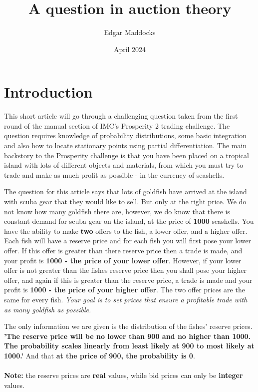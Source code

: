 \documentclass{article}
\title{A question in auction theory}
\author{Edgar Maddocks}
\date{April 2024}
\begin{document}
\maketitle

\section*{Introduction}
\begingroup
This short article will go through a challenging question taken from the first round of the manual section of
IMC's Prosperity 2 trading challenge. The question requires knowledge of probability 
distributions, some basic integration and also how to locate stationary points using 
partial differentiation. The main backstory to the Prosperity challenge is that you have been placed
on a tropical island with lots of different objects and materials, from which you must try to trade and make as
much profit as possible - in the currency of seashells. 

The question for this article says that lots of goldfish have 
arrived at the island with scuba gear that they would like to sell. But only at the right price. We do not know 
how many goldfish there are, however, we do know that there is constant demand for scuba gear on the island, 
at the price of \textbf{1000} seashells. You have the ability to make \textbf{two} offers to the fish, 
a lower offer, and a higher offer. Each fish will have a reserve price and for each fish you will first pose 
your lower offer. If this offer  is greater than there reserve price then a trade is made, and your profit is
\textbf{1000 - the price of your lower offer}. However, if your lower offer is not greater than the fishes reserve
price then you shall pose your higher offer, and again if this is greater than the reserve price, a trade is made
and your profit is \textbf{1000 - the price of your higher offer}. The two offer prices are the same for every fish.
\textit{Your goal is to set prices that ensure a profitable trade with as many goldfish as possible.}

The only information we are given is the distribution of the fishes' reserve prices.
\textbf{'The reserve price will be no lower than 900 and no higher than 1000. The 
probability scales linearly from least likely at 900 to most likely at 1000.'} And that 
\textbf{at the price of 900, the probability is 0}.
\\
\\
\textbf{Note:} the reserve prices are \textbf{real} values, while bid prices can only be
\textbf{integer} values.
\endgroup
\end{document}
